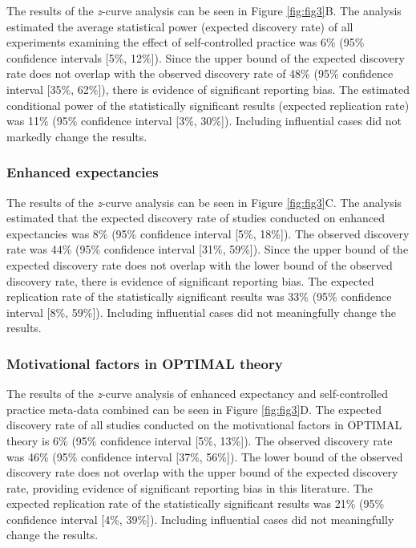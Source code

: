 \documentclass[
  man, donotrepeattitle,floatsintext]{apa7}
\begin{document}
The results of the \emph{z}-curve analysis can be seen in Figure \ref{fig:fig3}B. The analysis estimated the average statistical power (expected discovery rate) of all experiments examining the effect of self-controlled practice was 6\% (95\% confidence intervals {[}5\%, 12\%{]}). Since the upper bound of the expected discovery rate does not overlap with the observed discovery rate of 48\% (95\% confidence interval {[}35\%, 62\%{]}), there is evidence of significant reporting bias. The estimated conditional power of the statistically significant results (expected replication rate) was 11\% (95\% confidence interval {[}3\%, 30\%{]}). Including influential cases did not markedly change the results.

\hypertarget{enhanced-expectancies-1}{%
\subsubsection{Enhanced expectancies}\label{enhanced-expectancies-1}}

The results of the \emph{z}-curve analysis can be seen in Figure \ref{fig:fig3}C. The analysis estimated that the expected discovery rate of studies conducted on enhanced expectancies was 8\% (95\% confidence interval {[}5\%, 18\%{]}). The observed discovery rate was 44\% (95\% confidence interval {[}31\%, 59\%{]}). Since the upper bound of the expected discovery rate does not overlap with the lower bound of the observed discovery rate, there is evidence of significant reporting bias. The expected replication rate of the statistically significant results was 33\% (95\% confidence interval {[}8\%, 59\%{]}). Including influential cases did not meaningfully change the results.

\hypertarget{motivational-factors-in-optimal-theory}{%
\subsubsection{Motivational factors in OPTIMAL theory}\label{motivational-factors-in-optimal-theory}}

The results of the \emph{z}-curve analysis of enhanced expectancy and self-controlled practice meta-data combined can be seen in Figure \ref{fig:fig3}D. The expected discovery rate of all studies conducted on the motivational factors in OPTIMAL theory is 6\% (95\% confidence interval {[}5\%, 13\%{]}). The observed discovery rate was 46\% (95\% confidence interval {[}37\%, 56\%{]}). The lower bound of the observed discovery rate does not overlap with the upper bound of the expected discovery rate, providing evidence of significant reporting bias in this literature. The expected replication rate of the statistically significant results was 21\% (95\% confidence interval {[}4\%, 39\%{]}). Including influential cases did not meaningfully change the results.
\end{document}
